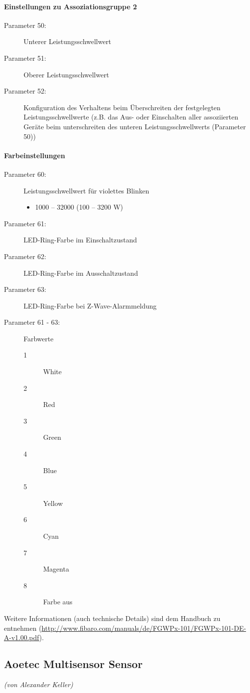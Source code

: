 \paragraph{Einstellungen zu Assoziationsgruppe 2}
\begin{description}
	\item [Parameter 50:] Unterer Leistungsschwellwert
	\item [Parameter 51:] Oberer Leistungsschwellwert
	\item [Parameter 52:] Konfiguration des Verhaltens beim Überschreiten der festgelegten Leistungsschwellwerte (z.B. das Aus- oder Einschalten aller assoziierten Geräte beim unterschreiten des unteren Leistungsschwellwerts (Parameter 50))
\end{description}

\paragraph{Farbeinstellungen}
\begin{description}
	\item[Parameter 60:] Leistungsschwellwert für violettes Blinken
	\begin{itemize}
		\item 1000 – 32000 (100 – 3200 W)
	\end{itemize}
	\item [Parameter 61:] LED-Ring-Farbe im Einschaltzustand
	\item [Parameter 62:] LED-Ring-Farbe im Ausschaltzustand
	\item [Parameter 63:] LED-Ring-Farbe bei Z-Wave-Alarmmeldung
	\item [Parameter 61 - 63:] Farbwerte
	\begin{description}
		\item [1] White
		\item [2] Red
		\item [3] Green
		\item [4] Blue
		\item [5] Yellow
		\item [6] Cyan
		\item [7] Magenta
		\item [8] Farbe aus
	\end{description}
\end{description}
Weitere Informationen (auch technische Details) sind dem Handbuch zu entnehmen (\url{http://www.fibaro.com/manuals/de/FGWPx-101/FGWPx-101-DE-A-v1.00.pdf}).


\subsection{Aoetec Multisensor Sensor}
\emph{(von Alexander Keller)}

